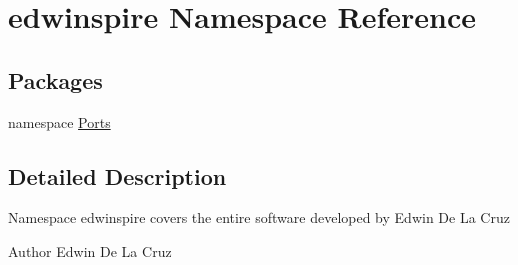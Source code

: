 \hypertarget{namespaceedwinspire}{\section{edwinspire Namespace Reference}
\label{namespaceedwinspire}
}
\subsection*{Packages}
\begin{DoxyCompactItemize}
\item 
namespace \hyperlink{namespaceedwinspire_1_1_ports}{Ports}
\end{DoxyCompactItemize}


\subsection{Detailed Description}
Namespace edwinspire covers the entire software developed by Edwin De La Cruz

\begin{DoxyAuthor}{Author}
Edwin De La Cruz 
\end{DoxyAuthor}
